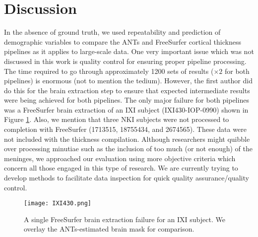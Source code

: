 \section{Discussion}
In the absence of ground truth, we used repeatability and prediction of
demographic variables to compare the ANTs and FreeSurfer cortical 
thickness pipelines as it applies to large-scale data.  One very important
issue which was not discussed in this work is quality control for 
ensuring proper pipeline processing.  The time required to go through 
approximately 1200 sets of results ($\times 2$ for both pipelines) is
enormous (not to mention the tedium).  However, the first
author did do this for the brain extraction step to ensure that expected
intermediate results were being achieved for both pipelines.  The only 
major failure for both pipelines was a FreeSurfer brain extraction of
an IXI subject (IXI430-IOP-0990) shown in Figure \ref{fig:ixi430}. 
Also, we mention that three NKI subjects were not processed to completion
with FreeSurfer (1713515, 18755434, and 2674565).  These data were not
included with the thickness compilation.
Although  researchers might quibble over processing minutiae such as the 
inclusion of too much (or not enough) of the meninges, we approached
our evaluation using more objective criteria which concern all those
engaged in this type of research.  We are currently trying to develop methods
to facilitate data inspection for quick quality assurance/quality control.

\begin{figure}[htb]
\texttt{[image: IXI430.png]}
\caption{A single FreeSurfer brain extraction failure for an IXI subject.  We 
         overlay the ANTs-estimated brain mask for comparison.}
\label{fig:ixi430}
\end{figure}

